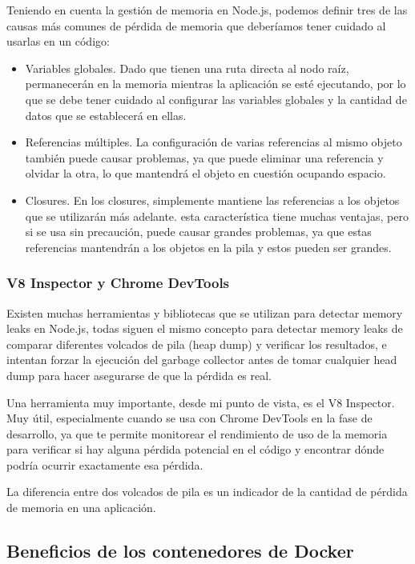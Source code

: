Teniendo en cuenta la gestión de memoria en Node.js, podemos definir tres de las causas más comunes de pérdida de memoria que deberíamos tener cuidado al usarlas en un código:

\begin{itemize}
  \item Variables globales. Dado que tienen una ruta directa al nodo raíz, permanecerán en la memoria mientras la aplicación se esté ejecutando, por lo que se debe tener cuidado al configurar las variables globales y la cantidad de datos que se establecerá en ellas.
  \item Referencias múltiples. La configuración de varias referencias al mismo objeto también puede causar problemas, ya que puede eliminar una referencia y olvidar la otra, lo que mantendrá el objeto en cuestión ocupando espacio.
  \item Closures. En los closures, simplemente mantiene las referencias a los objetos que se utilizarán más adelante. esta característica tiene muchas ventajas, pero si se usa sin precaución, puede causar grandes problemas, ya que estas referencias mantendrán a los objetos en la pila y estos pueden ser grandes.
\end{itemize}

\subsubsection{V8 Inspector y Chrome DevTools}

Existen muchas herramientas y bibliotecas que se utilizan para detectar memory leaks en Node.js, todas siguen el mismo concepto para detectar memory leaks de comparar diferentes volcados de pila (heap dump) y verificar los resultados, e intentan forzar la ejecución del garbage collector antes de tomar cualquier head dump para hacer asegurarse de que la pérdida es real.

Una herramienta muy importante, desde mi punto de vista, es el V8 Inspector. Muy útil, especialmente cuando se usa con Chrome DevTools en la fase de desarrollo, ya que te permite monitorear el rendimiento de uso de la memoria para verificar si hay alguna pérdida potencial en el código y encontrar dónde podría ocurrir exactamente esa pérdida.

La diferencia entre dos volcados de pila es un indicador de la cantidad de pérdida de memoria en una aplicación.

\subsection{Beneficios de los contenedores de Docker}

